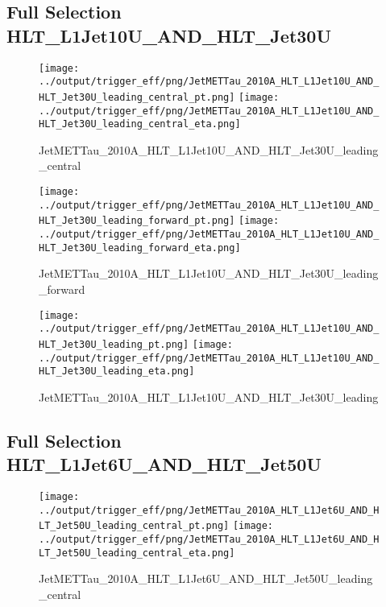 \documentclass[11pt]{article}
\begin{document}
\newpage
\subsection{Full Selection HLT\_L1Jet10U\_AND\_HLT\_Jet30U}
\begin{figure}[ht]
\centering
\texttt{[image: ../output/trigger\_eff/png/JetMETTau\_2010A\_HLT\_L1Jet10U\_AND\_HLT\_Jet30U\_leading\_central\_pt.png]}
\texttt{[image: ../output/trigger\_eff/png/JetMETTau\_2010A\_HLT\_L1Jet10U\_AND\_HLT\_Jet30U\_leading\_central\_eta.png]}
\caption{JetMETTau\_2010A\_HLT\_L1Jet10U\_AND\_HLT\_Jet30U\_leading\_central}
\label{fig:jetmettau_L1Jet10U_AND_HLT_Jet30U_leading_central}
\end{figure}

\begin{figure}[ht]
\centering
\texttt{[image: ../output/trigger\_eff/png/JetMETTau\_2010A\_HLT\_L1Jet10U\_AND\_HLT\_Jet30U\_leading\_forward\_pt.png]}
\texttt{[image: ../output/trigger\_eff/png/JetMETTau\_2010A\_HLT\_L1Jet10U\_AND\_HLT\_Jet30U\_leading\_forward\_eta.png]}
\caption{JetMETTau\_2010A\_HLT\_L1Jet10U\_AND\_HLT\_Jet30U\_leading\_forward}
\label{fig:jetmettau_L1Jet10U_AND_HLT_Jet30U_leading_forward}
\end{figure}

\begin{figure}[ht]
\centering
\texttt{[image: ../output/trigger\_eff/png/JetMETTau\_2010A\_HLT\_L1Jet10U\_AND\_HLT\_Jet30U\_leading\_pt.png]}
\texttt{[image: ../output/trigger\_eff/png/JetMETTau\_2010A\_HLT\_L1Jet10U\_AND\_HLT\_Jet30U\_leading\_eta.png]}
\caption{JetMETTau\_2010A\_HLT\_L1Jet10U\_AND\_HLT\_Jet30U\_leading}
\label{fig:jetmettau_L1Jet10U_AND_HLT_Jet30U_leading}
\end{figure}


\newpage
\subsection{Full Selection HLT\_L1Jet6U\_AND\_HLT\_Jet50U}
\begin{figure}[ht]
\centering
\texttt{[image: ../output/trigger\_eff/png/JetMETTau\_2010A\_HLT\_L1Jet6U\_AND\_HLT\_Jet50U\_leading\_central\_pt.png]}
\texttt{[image: ../output/trigger\_eff/png/JetMETTau\_2010A\_HLT\_L1Jet6U\_AND\_HLT\_Jet50U\_leading\_central\_eta.png]}
\caption{JetMETTau\_2010A\_HLT\_L1Jet6U\_AND\_HLT\_Jet50U\_leading\_central}
\label{fig:jetmettau_L1Jet6U_AND_HLT_Jet50U_leading_central}
\end{figure}
\end{document}
